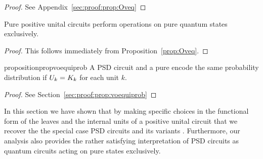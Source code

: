 \begin{proof}
	See Appendix~\ref{sec:proof:prop:Oveq}
\end{proof}



\begin{corollary}
	Pure positive unital circuits perform operations on pure quantum states exclusively.
\end{corollary}

\begin{proof}
	This follows immediately from Proposition~\ref{prop:Oveq}.
\end{proof}

\begin{restatable}{proposition}{propvoequiprob}
	\label{prop:voequiprob}
	A PSD circuit and a pure \punc encode the same probability distribution if $U_k=K_k$ for each unit $k$.
\end{restatable}



\begin{proof}
	See Section~\ref{sec:proof:prop:voequiprob}
\end{proof}

In this section we have shown that by making specific choices in the functional form of the leaves and the internal units of a positive unital circuit that we recover the the special case PSD circuits and its variants \citep{loconte2024subtractive,loconte2024sum}. Furthermore, our analysis also provides the rather satisfying interpretation of PSD circuits as quantum circuits acting on pure states exclusively.









